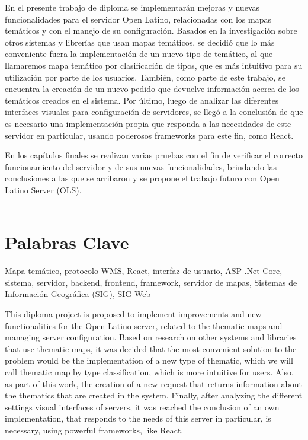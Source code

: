 
En el presente trabajo de diploma se implementar\'an mejoras y nuevas funcionalidades para el servidor Open Latino, relacionadas con los mapas tem\'aticos y con el manejo de su configuraci\'on. Basados en la investigaci\'on sobre otros sistemas y librer\'ias que usan mapas tem\'aticos, se decidi\'o que lo m\'as conveniente fuera la implementaci\'on de un nuevo tipo de tem\'atico, al que llamaremos mapa tem\'atico por clasificaci\'on de tipos, que es m\'as intuitivo para su utilizaci\'on por parte de los usuarios. Tambi\'en, como parte de este trabajo, se encuentra la creaci\'on de un nuevo pedido que devuelve informaci\'on acerca de los tem\'aticos creados en el sistema. Por \'ultimo, luego de analizar las diferentes interfaces visuales para configuraci\'on de servidores, se lleg\'o a la conclusi\'on de que es necesario una implementaci\'on propia que responda a las necesidades de este servidor en particular, usando poderosos frameworks para este fin, como React.

En los cap\'itulos finales se realizan varias pruebas con el fin de verificar el correcto funcionamiento del servidor y de sus nuevas funcionalidades, brindando las conclusiones a las que se arribaron y se propone el trabajo futuro con Open Latino Server (OLS).\\\\

\section*{Palabras Clave}
Mapa tem\'atico, protocolo WMS, React, interfaz de usuario, ASP .Net Core, sistema, servidor, backend, frontend, framework, servidor de mapas, Sistemas de Informaci\'on Geogr\'afica (SIG), SIG Web


This diploma project is proposed to implement improvements and new functionalities for the Open Latino server, related to the thematic maps and managing server configuration. Based on research on other systems and libraries that use thematic maps, it was decided that the most convenient solution to the problem would be the implementation of a new type of thematic, which we will call thematic map by type classification, which is more intuitive for users. Also, as part of this work, the creation of a new request that returns information about the thematics that are created in the system. Finally, after analyzing the different settings visual interfaces of servers, it was reached the conclusion of an own implementation, that responds to the needs of this server in particular, is necessary, using powerful frameworks, like React. 

